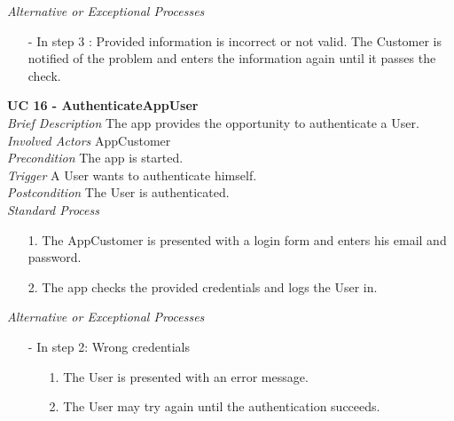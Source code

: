 \textit{Alternative or Exceptional Processes}
\begin{itemize}
	\item[-] In step 3 : Provided information is incorrect or not valid. The Customer is	notified of the problem and enters the information again until it passes the check.	
\end{itemize}

\textbf{UC 16 - AuthenticateAppUser}\\ \newline
\textit{Brief Description} The app provides the opportunity to authenticate a User.\\ \newline
\textit{Involved Actors} AppCustomer\\ \newline
\textit{Precondition} The app is started.\\ \newline
\textit{Trigger} A User wants to authenticate himself.\\ \newline
\textit{Postcondition} The User is authenticated.\\ \newline
\textit{Standard Process}
\begin{itemize}[leftmargin=*]
	\item[1.] The AppCustomer is presented with a login form and enters his email and password.
	\item[2.] The app checks the provided credentials and logs the User in.
\end{itemize}

\textit{Alternative or Exceptional Processes}
\begin{itemize}
	\item[-] In step 2: Wrong credentials
	\begin{itemize}
		\item[1.] The User is presented with an error message.
		\item[2.] The User may try again until the authentication succeeds.
	\end{itemize}
\end{itemize}


\newpage

